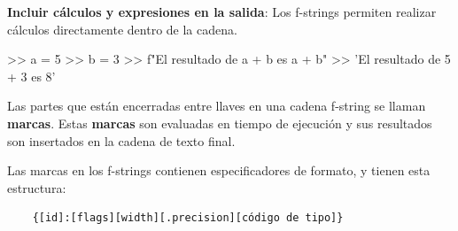 \noindent \textbf{Incluir cálculos y expresiones en la salida}: Los f-strings permiten realizar cálculos directamente dentro de la cadena. 
\begin{python}
>> a = 5
>> b = 3
>> f"El resultado de {a} + {b} es {a + b}"
>> 'El resultado de 5 + 3 es 8'
\end{python}

Las partes que están encerradas entre llaves \pythoninline{{}} en una cadena f-string se llaman \textbf{marcas}. Estas \textbf{marcas} son evaluadas en tiempo de ejecución y sus resultados son insertados en la cadena de texto final. 

Las marcas en los f-strings contienen especificadores de formato, y tienen esta estructura:

\begin{verbatim}
    {[id]:[flags][width][.precision][código de tipo]}
\end{verbatim}

